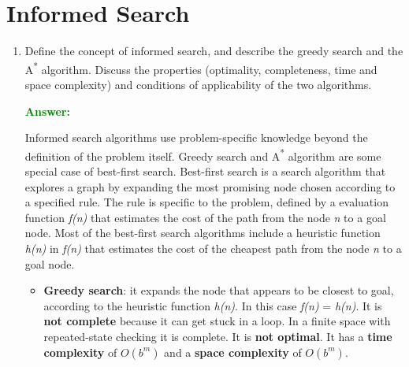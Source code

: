 \documentclass[12pt]{article}
\begin{document}
\section{Informed Search}\label{sec-informedsearch}
\begin{enumerate}[label=\textbf{IS.\arabic*}]
    \item Define the concept of informed search, and describe the greedy search and the A\textsuperscript{*} algorithm.
    Discuss the properties (optimality, completeness, time and space complexity) and conditions of applicability of the two algorithms.

    \textcolor{green}{\textbf{Answer:}}

    Informed search algorithms use problem-specific knowledge beyond the definition of the problem itself.
    Greedy search and A\textsuperscript{*} algorithm are some special case of best-first search.
    Best-first search is a search algorithm that explores a graph by expanding the most promising node chosen according to a specified rule.
    The rule is specific to the problem, defined by a evaluation function \textit{f(n)} that estimates the cost of the 
    path from the node \textit{n} to a goal node.
    Most of the best-first search algorithms include a heuristic function \textit{h(n)} in \textit{f(n)} that estimates the cost of the cheapest path from the node \textit{n} to a goal node.

    \begin{itemize}
        \item \textbf{Greedy search}: it expands the node that appears to be closest to goal, according to the heuristic function \textit{h(n)}.
        In this case \textit{f(n)} = \textit{h(n)}.
        It is \textbf{not complete} because it can get stuck in a loop. In a finite space with repeated-state checking it is complete.
        It is \textbf{not optimal}.
        It has a \textbf{time complexity} of $O(b^m)$ and a \textbf{space complexity} of $O(b^m)$.


\end{itemize}
\end{enumerate}
\end{document}
